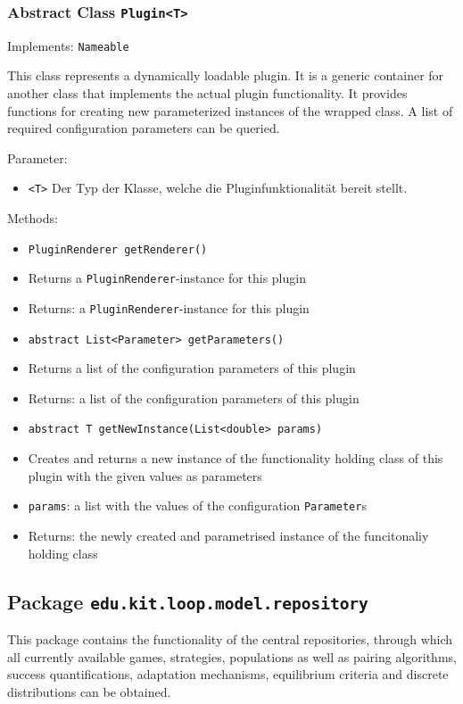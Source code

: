 \documentclass[parskip=full,11pt]{scrartcl}
\begin{document}
\subsubsection{Abstract Class \texttt{Plugin<T>}}
Implements: \texttt{Nameable}

This class represents a dynamically loadable plugin. It is a generic container for another class that implements the actual plugin functionality. It provides functions for creating new parameterized instances of the wrapped class. A list of required configuration parameters can be queried.

Parameter:
\begin{itemize}\itemsep -10pt
	\item \texttt{<T>} Der Typ der Klasse, welche die Pluginfunktionalität bereit stellt.
\end{itemize}

Methods:
\begin{itemize}\itemsep -10pt
	\item \texttt{PluginRenderer getRenderer()}
	\item[] Returns a \texttt{PluginRenderer}-instance for this plugin
	\item[] Returns: a \texttt{PluginRenderer}-instance for this plugin

	\item \texttt{abstract List<Parameter> getParameters()}
	\item[] Returns a list of the configuration parameters of this plugin
	\item[] Returns: a list of the configuration parameters of this plugin

	\item \texttt{abstract T getNewInstance(List<double> params)}
	\item[] Creates and returns a new instance of the functionality holding class of this plugin with the given values as parameters
	\item[] \texttt{params}: a list with the values of the configuration \texttt{Parameter}s
	\item[] Returns: the newly created and parametrised instance of the funcitonaliy holding class
\end{itemize}

\subsection{Package \texttt{edu.kit.loop.model.repository}}

This package contains the functionality of the central repositories, through which all currently available games, strategies, populations as well as pairing algorithms, success quantifications, adaptation mechanisms, equilibrium criteria and discrete distributions can be obtained.
\end{document}
